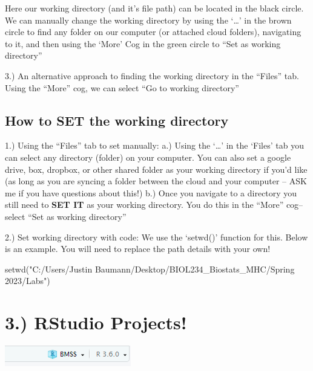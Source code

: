 \documentclass[
  letterpaper,
  DIV=11,
  numbers=noendperiod]{scrartcl}
\newenvironment{Shaded}{\begin{snugshade}}{\end{snugshade}}
\newcommand{\FunctionTok}[1]{\textcolor[rgb]{0.28,0.35,0.67}{#1}}
\newcommand{\NormalTok}[1]{\textcolor[rgb]{0.00,0.23,0.31}{#1}}
\newcommand{\StringTok}[1]{\textcolor[rgb]{0.13,0.47,0.30}{#1}}
\begin{document}
Here our working directory (and it's file path) can be located in the
black circle. We can manually change the working directory by using the
`\ldots{}' in the brown circle to find any folder on our computer (or
attached cloud folders), navigating to it, and then using the `More' Cog
in the green circle to ``Set as working directory''

3.) An alternative approach to finding the working directory in the
``Files'' tab. Using the ``More'' cog, we can select ``Go to working
directory''

\hypertarget{how-to-set-the-working-directory}{%
\subsection{\texorpdfstring{\textbf{How to SET the working
directory}}{How to SET the working directory}}\label{how-to-set-the-working-directory}}

1.) Using the ``Files'' tab to set manually: a.) Using the `\ldots{}' in
the `Files' tab you can select any directory (folder) on your computer.
You can also set a google drive, box, dropbox, or other shared folder as
your working directory if you'd like (as long as you are syncing a
folder between the cloud and your computer -- ASK me if you have
questions about this!) b.) Once you navigate to a directory you still
need to \textbf{SET IT} as your working directory. You do this in the
``More'' cog-- select ``Set as working directory''

2.) Set working directory with code: We use the `setwd()' function for
this. Below is an example. You will need to replace the path details
with your own!

\begin{Shaded}
\begin{Highlighting}[]
\FunctionTok{setwd}\NormalTok{(}\StringTok{"C:/Users/Justin Baumann/Desktop/BIOL234\_Biostats\_MHC/Spring 2023/Labs"}\NormalTok{)}
\end{Highlighting}
\end{Shaded}

\hypertarget{rstudio-projects}{%
\section{\texorpdfstring{\textbf{3.) RStudio
Projects!}}{3.) RStudio Projects!}}\label{rstudio-projects}}

\includegraphics{images/projects.png}\\
\end{document}
